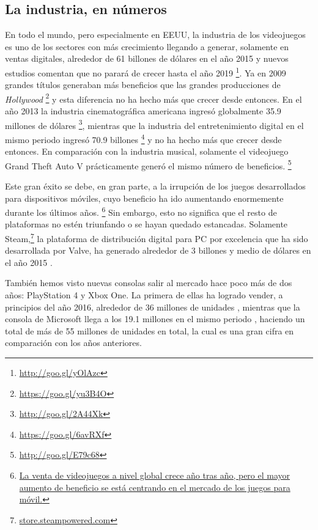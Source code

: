 \subsection{La industria, en números}
En todo el mundo, pero especialmente en EEUU, la industria de los videojuegos es uno de los sectores con más crecimiento \cite{website:gamesimprovingeconomy} llegando a generar, solamente en ventas digitales, alrededor de 61 billones de dólares en el año 2015 \cite{website:gamingsales} y nuevos estudios comentan que no parará de crecer hasta el año 2019 \footnote{\url{http://goo.gl/yOlAzc}}. Ya en 2009 grandes títulos generaban más beneficios que las grandes producciones de \textit{Hollywood} \footnote{\url{https://goo.gl/yu3B4O}} y esta diferencia no ha hecho más que crecer desde entonces. En el año 2013 la industria cinematográfica americana ingresó globalmente 35.9 millones de dólares \footnote{\url{http://goo.gl/2A44Xk}}, mientras que la industria del entretenimiento digital en el mismo periodo ingresó 70.9 billones \footnote{\url{https://goo.gl/6avRXf}} y no ha hecho más que crecer desde entonces. En comparación con la industria musical, solamente el videojuego Grand Theft Auto V prácticamente generó el mismo número de beneficios. \footnote{\url{http://goo.gl/E79c68}}

Este gran éxito se debe, en gran parte, a la irrupción de los juegos desarrollados para dispositivos móviles, cuyo beneficio ha ido aumentando enormemente durante los últimos años. \footnote{\href{https://goo.gl/cvqds0}{La venta de videojuegos a nivel global crece año tras año, pero el mayor aumento de beneficio se está centrando en el mercado de los juegos para móvil.}} Sin embargo, esto no significa que el resto de plataformas no estén triunfando o se hayan quedado estancadas. Solamente Steam,\footnote{\url{store.steampowered.com}} la plataforma de distribución digital para PC por excelencia que ha sido desarrollada por Valve, ha generado alrededor de 3 billones y medio de dólares en el año 2015 \cite{website:steamgamesmarket}.

También hemos visto nuevas consolas salir al mercado hace poco más de dos años: PlayStation 4 y Xbox One. La primera de ellas ha logrado vender, a principios del año 2016, alrededor de 36 millones de unidades \cite{website:ps4sales}, mientras que la consola de Microsoft llega a los 19.1 millones en el mismo periodo \cite{website:xboxonesales}, haciendo un total de más de 55 millones de unidades en total, la cual es una gran cifra en comparación con los años anteriores.

